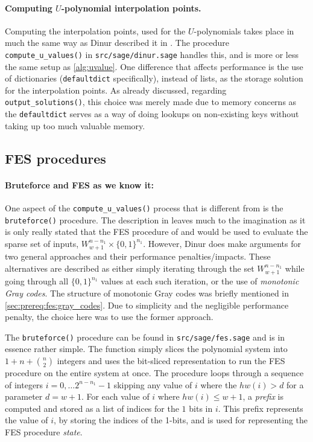 \paragraph{Computing $U$-polynomial interpolation points.} Computing the interpolation points, used for the $U$-polynomials takes place in much the same way as Dinur described it in \cite{eurocrypt-2021-30841}. The procedure \texttt{compute\_u\_values()} in \texttt{src/sage/dinur.sage} handles this, and is more or less the same setup as \cref{alg:uvalue}. One difference that affects performance is the use of dictionaries (\texttt{defaultdict} specifically), instead of lists, as the storage solution for the interpolation points.
As already discussed, regarding \texttt{output\_solutions()}, this choice was merely made due to memory concerns as the \texttt{defaultdict} serves as a way of doing lookups on non-existing keys without taking up too much valuable memory.

\subsection{FES procedures} \label{sec:impl:fes}

\paragraph{Bruteforce and FES as we know it:} One aspect of the \texttt{compute\_u\_values()} process that is different from \cite{eurocrypt-2021-30841} is the \texttt{bruteforce()} procedure. The description in \cite{eurocrypt-2021-30841} leaves much to the imagination as it is only really stated that the FES procedure of \cite{cryptoeprint:2013/436} and \cite{ches-2010-23990} would be used to evaluate the sparse set of inputs, $W^{n - n_1}_{w + 1} \times \{0,1\}^{n_1}$. However, Dinur does make arguments for two general approaches and their performance penalties/impacts. These alternatives are described as either simply iterating through the set $W^{n - n_1}_{w + 1}$ while going through all $\{0,1\}^{n_1}$ values at each such iteration, or the use of \textit{monotonic Gray codes}. The structure of monotonic Gray codes was briefly mentioned in \cref{sec:prereq:fes:gray_codes}. Due to simplicity and the negligible performance penalty, the choice here was to use the former approach. 

The \texttt{bruteforce()} procedure can be found in \texttt{src/sage/fes.sage} and is in essence rather simple. The function simply slices the polynomial system into $1 + n + \binom{n}{2}$ integers and uses the bit-sliced representation to run the FES procedure on the entire system at once. The procedure loops through a sequence of integers $i = 0, \dots 2^{n - n_1} - 1$ skipping any value of $i$ where the $hw(i) > d$ for a parameter $d = w + 1$. For each value of $i$ where $hw(i) \leq w + 1$, a \textit{prefix} is computed and stored as a list of indices for the $1$ bits in $i$.
This prefix represents the value of $i$, by storing the indices of the 1-bits, and is used for representing the FES procedure \textit{state}.

